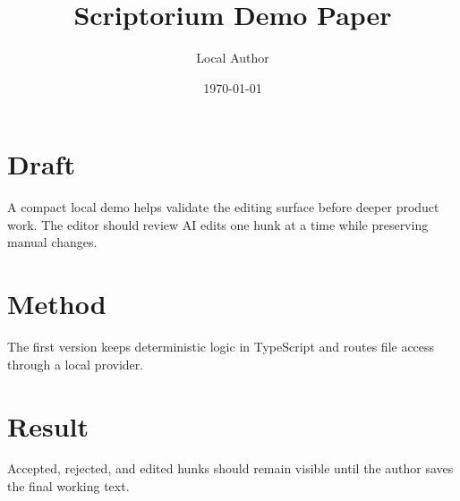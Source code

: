 \documentclass{article}
\title{Scriptorium Demo Paper}
\author{Local Author}
\date{\today}
\begin{document}
\maketitle

\section{Draft}

A compact local demo helps validate the editing surface before deeper product work.
The editor should review AI edits one hunk at a time while preserving manual changes.

\section{Method}

The first version keeps deterministic logic in TypeScript and routes file access through a local provider.

\section{Result}

Accepted, rejected, and edited hunks should remain visible until the author saves the final working text.
\end{document}
